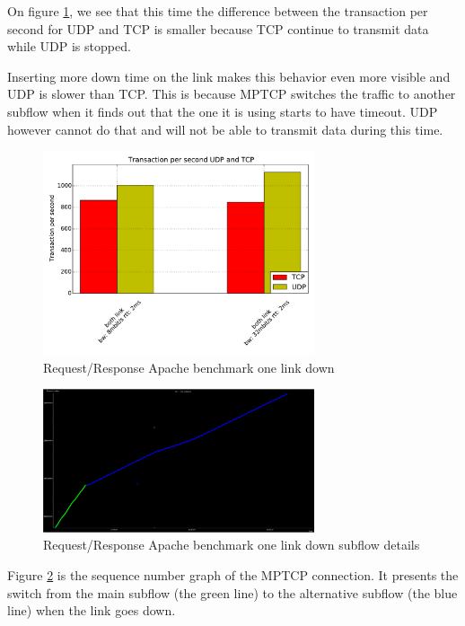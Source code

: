 On figure \ref{request_response_link_down_ab}, we see that this time the difference between the transaction per second for UDP and TCP is smaller because TCP continue to transmit data while
UDP is stopped.

Inserting more down time on the link makes this behavior even more visible and UDP is slower than TCP.
This is because MPTCP switches the traffic to another subflow when it finds out that the one it is using starts to have timeout.
UDP however cannot do that and will not be able to transmit data during this time.

   \begin{figure}[h!]
    \centering
    \includegraphics[width=8cm]{../results/request_response_link_down_ab.pdf}
    \caption{Request/Response Apache benchmark one link down}
    \label{request_response_link_down_ab}
  \end{figure}

   \begin{figure}[h!]
    \centering
    \includegraphics[width=8cm]{../results/request_response_subflow_change.pdf}
    \caption{Request/Response Apache benchmark one link down subflow details}
    \label{request_response_subflow_change}
  \end{figure}


Figure \ref{request_response_subflow_change} is the sequence number graph of the MPTCP connection.
It presents the switch from the main subflow (the green line) to the alternative subflow (the blue line) when the link goes down.

